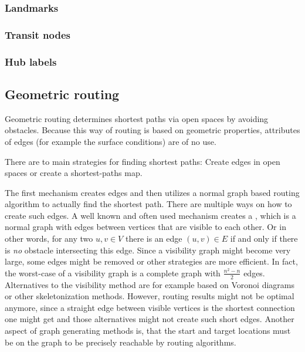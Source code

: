 		\subsubsection{Landmarks}
		
		\subsubsection{Transit nodes}
		
		\subsubsection{Hub labels}
	
	\subsection{Geometric routing}
	\label{subsec:geometric-routing}
	
		Geometric routing determines shortest paths via open spaces by avoiding obstacles.
		Because this way of routing is based on geometric properties, attributes of edges (for example the surface conditions) are of no use.
		
		
		There are to main strategies for finding shortest paths:
		Create edges in open spaces or create a shortest-paths map.
		
		The first mechanism creates edges and then utilizes a normal graph based routing algorithm to actually find the shortest path.
		There are multiple ways on how to create such edges.
		A well known and often used mechanism creates a , which is a normal graph with edges between vertices that are visible to each other.
		Or in other words, for any two $u, v \in V$ there is an edge $(u, v) \in E$ if and only if there is \textit{no} obstacle intersecting this edge.
		Since a visibility graph might become very large, some edges might be removed or other strategies are more efficient.
		In fact, the worst-case of a visibility graph is a complete graph with $\frac{n^2 - n}{2}$ edges.
		Alternatives to the visibility method are for example based on Voronoi diagrams or other skeletonization methods\cite[219-220]{graser-osm-open-spaces}.
		However, routing results might not be optimal anymore, since a straight edge between visible vertices is the shortest connection one might get and those alternatives might not create such short edges\cite[223]{graser-osm-open-spaces}.
		Another aspect of graph generating methods is, that the start and target locations must be on the graph to be precisely reachable by routing algorithms.
		
